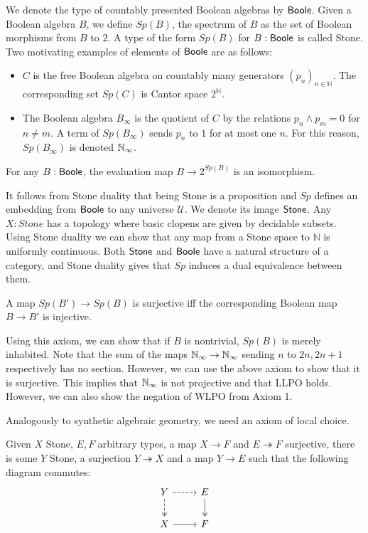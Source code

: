 \documentclass{../util/zariski}
\begin{document}
\medskip

We denote the type of countably presented Boolean algebras by $\mathsf{Boole}$.
Given a Boolean algebra $B$, we define $Sp(B)$, the spectrum of $B$ as the set of Boolean morphisms from $B$ to $2$.  
A type of the form $Sp(B)$ for $B:\mathsf{Boole}$ is called Stone.
%
Two motivating examples of elements of $\mathsf{Boole}$ are as follows:
 \begin{itemize}
   \item $C$ is the free Boolean algebra on countably many generators $(p_n)_{n\in\mathbb N}$. 
     The corresponding set $Sp(C)$ is Cantor space $2^\mathbb N$. 
   \item 
     The Boolean algebra $ B_\infty$ is %
     the quotient of $C$ by the relations $p_n\wedge p_m = 0$ for $n\neq m$.  
     A term of $Sp(B_\infty)$ sends $p_n$ to $1$ for at most one $n$. 
     For this reason, $Sp(B_\infty)$ is denoted $\mathbb{N}_{\infty}$. 
  \end{itemize} 

\begin{axiom}
  For any 
  $B:\mathsf{Boole}$, 
  the evaluation map $B \to 2^{Sp(B)}$ is an isomorphism. 
\end{axiom}
It follows from Stone duality that being Stone is a proposition and $Sp$ defines an embedding from $\mathsf{Boole}$ 
to any universe $\mathcal U$. We denote its image $\mathsf{Stone}$. 
Any $X:Stone$ has a topology where basic clopens are given by decidable subsets. 
Using Stone duality we can show that any map from a Stone space to $\mathbb N$ is uniformly continuous. 
Both $\mathsf{Stone}$ and $\mathsf{Boole}$ have a natural structure of a category, and 
Stone duality gives that $Sp$ induces a dual equivalence between them. 

\begin{axiom}
  A map $Sp(B')\to Sp(B)$ is surjective iff the corresponding Boolean map $B \to B'$ is injective.
\end{axiom} 
Using this axiom, we can show that if $B$ is nontrivial, $Sp(B)$ is merely inhabited.
%
%
Note that the sum of the maps $\mathbb{N}_{\infty} \to \mathbb{N}_{\infty}$ sending $n$ to $2n,2n+1$ respectively has no section. 
However, we can use the above axiom to show that it is surjective. 
This implies that $\mathbb{N}_{\infty}$ is not projective and that LLPO holds. 
However, we can also show the negation of WLPO from Axiom 1.  

\medskip

Analogously to synthetic algebraic geometry, we need an axiom of local choice. 
\begin{axiom}
  Given $X$ Stone, $E,F$ arbitrary types, a map $X \to F$ and $E\twoheadrightarrow F$ surjective, 
  there is some $Y$ Stone,
    a surjection $Y \twoheadrightarrow X$ and a map $Y\to E$ such that the following diagram commutes:
    \begin{equation*}\begin{tikzcd}
      Y \arrow [d, two heads,dashed] \arrow [r,dashed] & E \arrow[d,""',two heads]\\
      X \arrow[r] & F
    \end{tikzcd}\end{equation*}  
\end{axiom} 
\end{document}
